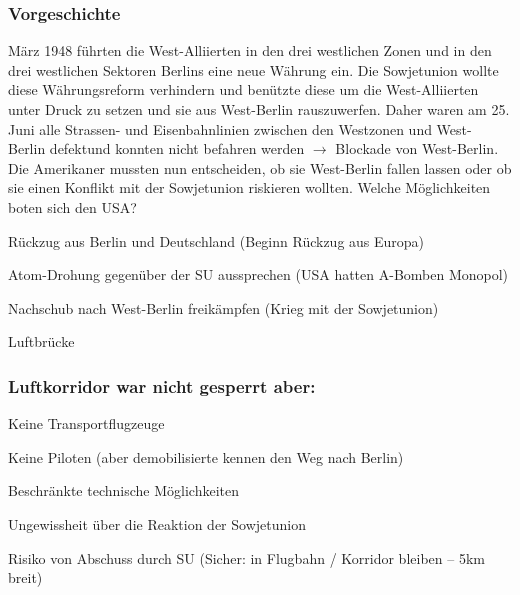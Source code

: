 \documentclass[10pt, openright=true]{scrartcl}
\begin{document}
\subsubsection{Vorgeschichte}
März 1948 führten die West-Alliierten in den drei westlichen Zonen und in den drei westlichen Sektoren Berlins eine neue Währung ein. Die Sowjetunion wollte diese Währungsreform verhindern und benützte diese um die West-Alliierten unter Druck zu setzen und sie aus West-Berlin rauszuwerfen. Daher waren am 25. Juni alle Strassen- und Eisenbahnlinien zwischen den Westzonen und West- Berlin \glqq defekt\grqq und konnten nicht befahren werden $ \rightarrow $ Blockade von West-Berlin.  Die Amerikaner mussten nun entscheiden, ob sie West-Berlin fallen lassen oder ob sie einen Konflikt mit der Sowjetunion riskieren wollten. Welche Möglichkeiten boten sich den USA? \\
\begin{citemize}
\item Rückzug aus Berlin und Deutschland (Beginn Rückzug aus Europa)
\item Atom-Drohung gegenüber der SU aussprechen (USA hatten A-Bomben Monopol)
\item Nachschub nach West-Berlin freikämpfen (Krieg mit der Sowjetunion)
\item Luftbrücke
\end{citemize}
\subsubsection{Luftkorridor war nicht gesperrt aber:}
\begin{citemize}
\item Keine Transportflugzeuge
\item Keine Piloten (aber demobilisierte \glqq kennen \grqq den Weg nach Berlin)
\item Beschränkte technische Möglichkeiten
\item Ungewissheit über die Reaktion der Sowjetunion
\item Risiko von Abschuss durch SU (Sicher: in Flugbahn / Korridor bleiben – 5km breit)
\end{citemize}
\end{document}
